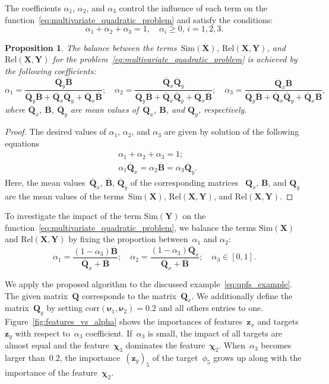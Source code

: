 \documentclass[12pt,twoside]{article}
\newtheorem{proposition}{Proposition}
\theoremstyle{definition}
\newcommand{\bz}{\mathbf{z}}
\newcommand{\bY}{\mathbf{Y}}
\newcommand{\bX}{\mathbf{X}}
\newcommand{\bB}{\mathbf{B}}
\newcommand{\bQ}{\mathbf{Q}}
\newcommand{\bchi}{\boldsymbol{\chi}}
\newcommand{\bnu}{\boldsymbol{\nu}}
\begin{document}
The coefficients $\alpha_1$, $\alpha_2$, and $\alpha_3$ control the influence of each term on the function~\eqref{eq:multivariate_quadratic_problem} and satisfy the conditions:
\[
\alpha_1 + \alpha_2 + \alpha_3 = 1, \quad \alpha_i \geq 0, \, i = 1, 2, 3.
\]
\begin{proposition}
	The balance between the terms~$\text{Sim}(\bX)$, $\text{Rel}(\bX, \bY)$, and $\text{Rel}(\bX, \bY)$ for the problem~\eqref{eq:multivariate_quadratic_problem} is achieved by the following coefficients:
	\[
	\alpha_1 = \frac{\overline{\bQ}_y \overline{\bB} }{\overline{\bQ}_y \overline{\bB} + \overline{\bQ}_x \overline{\bQ}_y + \overline{\bQ}_x \overline{\bB}}; \quad
	\alpha_2 = \frac{\overline{\bQ}_x \overline{\bQ}_y}{\overline{\bQ}_y \overline{\bB} + \overline{\bQ}_x \overline{\bQ}_y + \overline{\bQ}_x \overline{\bB}}; \quad
	\alpha_3  = \frac{\overline{\bQ}_x \overline{\bB}}{\overline{\bQ}_y \overline{\bB} + \overline{\bQ}_x \overline{\bQ}_y + \overline{\bQ}_x \overline{\bB}},
	\]
	where $\overline{\bQ}_x$, $\overline{\bB}$, $\overline{\bQ}_y$ are mean values of~$\bQ_x$, $\bB$, and $\bQ_y$, respectively.

\end{proposition}
\begin{proof}
	The desired values of $\alpha_1$, $\alpha_2$, and $\alpha_3$ are given by solution of the following equations
	\begin{align*}
		&\alpha_1 + \alpha_2 + \alpha_3 = 1; \\
		&\alpha_1 \overline{\bQ}_x = \alpha_2 \overline{\bB} = \alpha_3 \overline{\bQ}_y.
	\end{align*}
	Here, the mean values~$\overline{\bQ}_x$, $\overline{\bB}$, $\overline{\bQ}_y$ of the corresponding matrices ~$\bQ_x$, $\bB$, and $\bQ_y$ are the mean values of the terms~$\text{Sim}(\bX)$, $\text{Rel}(\bX, \bY)$, and $\text{Rel}(\bX, \bY)$.
\end{proof}
To investigate the impact of the term $\text{Sim}(\bY)$ on the function~\eqref{eq:multivariate_quadratic_problem}, we balance the terms $\text{Sim}(\bX)$ and $\text{Rel}(\bX, \bY)$ by fixing the proportion between~$\alpha_1$ and $\alpha_2$:
\begin{equation}
\alpha_1 = \frac{(1 - \alpha_3)\overline{\bB}}{\overline{\bQ}_x + \overline{\bB}}; \quad
\alpha_2 = \frac{(1 - \alpha_3)\overline{\bQ}_x}{\overline{\bQ}_x + \overline{\bB}}; \quad
\alpha_3 \in [0, 1].
\label{eq:alphas3}
\end{equation}

We apply the proposed algorithm to the discussed example~\eqref{eq:qpfs_example}.
The given matrix~$\bQ$ corresponds to the matrix~$\bQ_x$.
We additionally define the matrix~$\bQ_y$ by setting $\text{corr}(\bnu_1, \bnu_2) = 0.2$ and all others entries to one.
Figure~\ref{fig:features_vs_alpha} shows the importances of features~$\bz_x$ and targets~$\bz_y$ with respect to~$\alpha_3$ coefficient.
If~$\alpha_3$ is small, the impact of all targets are almost equal and the feature~$\bchi_3$ dominates the feature~$\bchi_2$. When~$\alpha_3$ becomes larger than~$0.2$, the importance~$(\bz_y)_5$ of the target~$\phi_5$ grows up along with the importance of the feature~$\bchi_2$.
\end{document}
